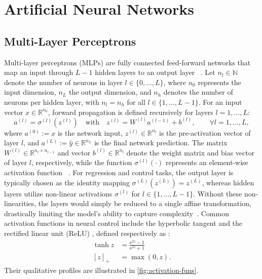 \section{Artificial Neural Networks}
\label{sec:ann}

\subsection{Multi-Layer Perceptrons}
\label{subsec:mlp}

Multi-layer perceptrons (MLPs) are fully connected feed-forward networks that map an input 
through $L-1$ hidden layers to an output layer~
.
Let $n_l \in \mathbb{N}$ denote the number of neurons in layer $l \in \{0, \dots, L\}$, where $n_0$ represents 
the input dimension, $n_L$ the output dimension, and $n_h$ denotes the number of neurons per hidden layer, 
with $n_l = n_h$ for all $l \in \{1, \dots, L-1\}$.
For an input vector $x \in \mathbb{R}^{n_0}$, forward propagation is defined recursively for layers $l = 1, \dots, L$:
\begin{equation}
    \label{eq:nn-forward}
    a^{(l)} = \sigma^{(l)}\!\left( z^{(l)} \right) \quad 
    \text{with} \quad z^{(l)} = W^{(l)} a^{(l-1)} + b^{(l)}, 
    \qquad \forall l = 1, \dots, L,
\end{equation}
where $a^{(0)} := x$ is the network input, $z^{(l)} \in \mathbb{R}^{n_l}$ 
is the pre-activation vector of layer $l$, and $a^{(L)} := \hat{y} \in \mathbb{R}^{n_L}$ 
is the final network prediction. The matrix $W^{(l)} \in \mathbb{R}^{n_l \times n_{l-1}}$ 
and vector $b^{(l)} \in \mathbb{R}^{n_l}$ denote the weight matrix and bias vector of layer $l$, respectively, 
while the function $\sigma^{(l)}(\cdot)$ represents an element-wise activation function
~. For regression and control tasks, 
the output layer is typically chosen as the identity mapping $\sigma^{(L)}(z^{(L)}) = z^{(L)}$, 
whereas hidden layers utilize non-linear activations $\sigma^{(l)}$ for $l \in \{1, \dots, L-1\}$.
Without these non-linearities, the layers would simply be reduced to a single affine transformation, 
drastically limiting the model's ability to capture complexity~. 
Common activation functions in neural control include the hyperbolic tangent  and 
the rectified linear unit (ReLU) , defined respectively as
:
\begin{subequations}
    \label{eq:act-funs}
    \begin{align}
        \tanh z &= \frac{\mathrm{e}^{2z} - 1}{\mathrm{e}^{2z} + 1} \label{eq:tanh} \\
        {[z]_+} &= \max(0, z) \label{eq:relu}.
    \end{align}
\end{subequations}
Their qualitative profiles are illustrated in \cref{fig:activation-funs}.


